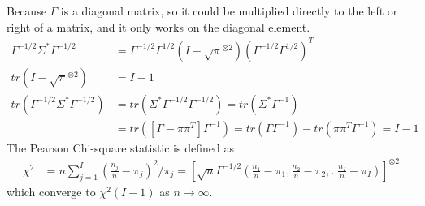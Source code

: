 \documentclass[11pt]{article} %
\begin{document}
	Because $\Gamma$ is a diagonal matrix, so it could be multiplied directly to the left or right of a matrix, and it only works on the diagonal element. \\
	\begin{align*}
		\Gamma^{-1/2} \Sigma^{\ast} \Gamma^{-1/2} &= \Gamma^{-1/2} \Gamma^{1/2} (I - \sqrt{\pi}^{\otimes 2}) \left( \Gamma^{-1/2} \Gamma^{1/2} \right)^T\\
		tr(I - \sqrt{\pi}^{\otimes 2}) & = I-1 \\
		tr(\Gamma^{-1/2} \Sigma^{\ast} \Gamma^{-1/2}) &= tr( \Sigma^{\ast} \Gamma^{-1/2} \Gamma^{-1/2}) = tr( \Sigma^{\ast} \Gamma^{-1}) \\
		&= tr( [\Gamma - \pi \pi^T] \Gamma^{-1}) = tr(\Gamma\Gamma^{-1}) - tr(\pi \pi^T \Gamma^{-1}) = I-1
	\end{align*}
	The Pearson Chi-square statistic is defined as
	\begin{align*}
		\chi^2 &= n \sum_{j=1}^I (\frac{n_j}{n} - \pi_j)^2/\pi_j = \left[ \sqrt{n} \Gamma^{-1/2} \left(\frac{n_1}{n} - \pi_1, \frac{n_2}{n} - \pi_2, ..\frac{n_I}{n}-\pi_I \right) \right]^{\otimes 2}
	\end{align*}
	which converge to $\chi^2(I-1)$ as $n \rightarrow \infty$.
\end{document}
